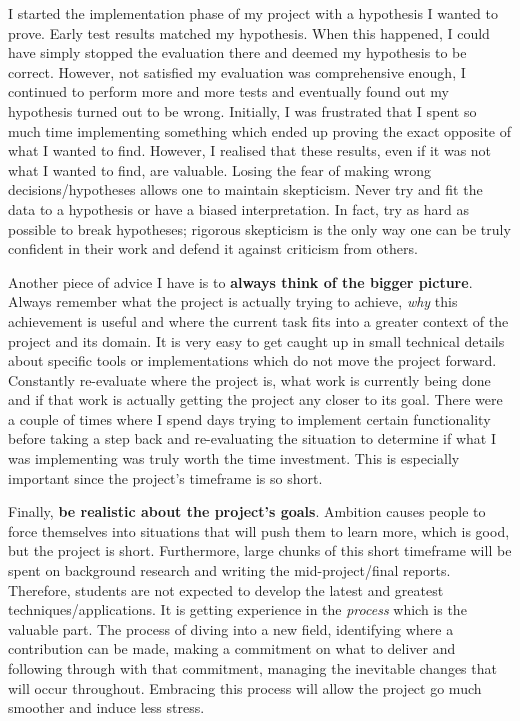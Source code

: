 I started the implementation phase of my project with a hypothesis I wanted to prove. Early test results matched my hypothesis. When this happened, I could have simply stopped the evaluation there and deemed my hypothesis to be correct. However, not satisfied my evaluation was comprehensive enough, I continued to perform more and more tests and eventually found out my hypothesis turned out to be wrong. Initially, I was frustrated that I spent so much time implementing something which ended up proving the exact opposite of what I wanted to find. However, I realised that these results, even if it was not what I wanted to find, are valuable. Losing the fear of making wrong decisions/hypotheses allows one to maintain skepticism. Never try and fit the data to a hypothesis or have a biased interpretation. In fact, try as hard as possible to break hypotheses; rigorous skepticism is the only way one can be truly confident in their work and defend it against criticism from others.

Another piece of advice I have is to \textbf{always think of the bigger picture}. Always remember what the project is actually trying to achieve, \textit{why} this achievement is useful and where the current task fits into a greater context of the project and its domain. It is very easy to get caught up in small technical details about specific tools or implementations which do not move the project forward. Constantly re-evaluate where the project is, what work is currently being done and if that work is actually getting the project any closer to its goal. There were a couple of times where I spend days trying to implement certain functionality before taking a step back and re-evaluating the situation to determine if what I was implementing was truly worth the time investment. This is especially important since the project's timeframe is so short.

Finally, \textbf{be realistic about the project's goals}. Ambition causes people to force themselves into situations that will push them to learn more, which is good, but the project is short. Furthermore, large chunks of this short timeframe will be spent on background research and writing the mid-project/final reports. Therefore, students are not expected to develop the latest and greatest techniques/applications. It is getting experience in the \textit{process} which is the valuable part. The process of diving into a new field, identifying where a contribution can be made, making a commitment on what to deliver and following through with that commitment, managing the inevitable changes that will occur throughout. Embracing this process will allow the project go much smoother and induce less stress.

